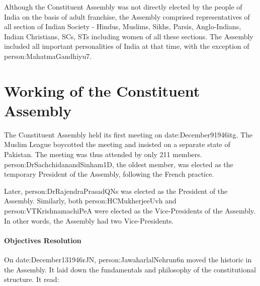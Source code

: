 Although the Constituent Assembly was not directly elected by the people of India on the basis of adult franchise, the Assembly comprised representatives of all section of Indian Society - Hindus, Muslims, Sikhs, Parsis, Anglo-Indians, Indian Christians, SCs, STs including women of all these sections. The Assembly included all important personalities of India at that time, with the exception of \gls{person:MahatmaGandhiyu7}.

\section{Working of the Constituent Assembly}

The Constituent Assembly held its first meeting on \gls{date:December91946itg}. The Muslim League boycotted the meeting and insisted on a separate state of Pakistan. The meeting was thus attended by only 211 members. {\gls{person:DrSachchidanandSinham1D}, the oldest member, was elected as the temporary President of the Assembly, following the French practice.}

Later, \gls{person:DrRajendraPrasadQNs} was elected as the President of the Assembly. Similarly, both \gls{person:HCMukherjeeUvh} and \gls{person:VTKrishnamachiPeA} were elected as the Vice-Presidents of the Assembly. In other words, the Assembly had two Vice-Presidents.

\paragraph{Objectives Resolution}

On \gls{date:December131946rJN}, \gls{person:JawaharlalNehrun6n} moved the historic  in the Assembly. It laid down the fundamentals and philosophy of the constitutional structure. It read:

